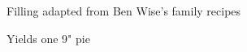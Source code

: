 \documentclass[12pt]{article}
\newenvironment*{notes}
	{
		\paragraph*{Notes}
		\begin{adjustwidth}{1cm}{}
	}
	{
		\end{adjustwidth}
	}
\begin{document}
%	

	Filling adapted from Ben Wise's family recipes
	
	Yields one 9" pie
	
\end{document}
